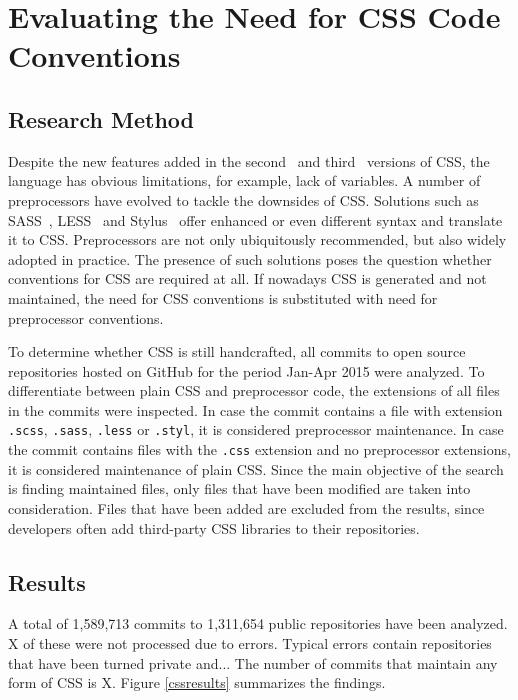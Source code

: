 \chapter{Evaluating the Need for CSS Code Conventions}
\label{sec:evaluating}

\section{Research Method}

Despite the new features added in the second~\cite{CSS2} and third~\cite{CSS3} versions of CSS, the
language has obvious limitations, for example, lack of variables. A number of preprocessors have
evolved to tackle the downsides of CSS. Solutions such as SASS~\cite{SASS}, LESS~\cite{LESS} and
Stylus~\cite{Stylus} offer enhanced or even different syntax and translate it to CSS. Preprocessors
are not only ubiquitously recommended, but also widely adopted in practice. The presence of such
solutions poses the question whether conventions for CSS are required at all. If nowadays CSS is
generated and not maintained, the need for CSS conventions is substituted with need for preprocessor conventions.

To determine whether CSS is still handcrafted, all commits to open source repositories hosted on
GitHub for the period Jan-Apr 2015 were analyzed. To differentiate between plain CSS and
preprocessor code, the extensions of all files in the commits were inspected. In case the commit
contains a file with extension \texttt{.scss}, \texttt{.sass}, \texttt{.less} or \texttt{.styl}, it
is considered preprocessor maintenance. In case the commit contains files with the \texttt{.css}
extension and no preprocessor extensions, it is considered maintenance of plain CSS. Since the main
objective of the search is finding maintained files, only files that have been modified are taken
into consideration. Files that have been added are excluded from the results, since developers often
add third-party CSS libraries to their repositories.


\section{Results}

A total of 1,589,713 commits to 1,311,654 public repositories have been analyzed. X of these were
not processed due to errors. Typical errors contain repositories that have been turned private
and... The number of commits that maintain any form of CSS is X. Figure \ref{cssresults} summarizes
the findings.

